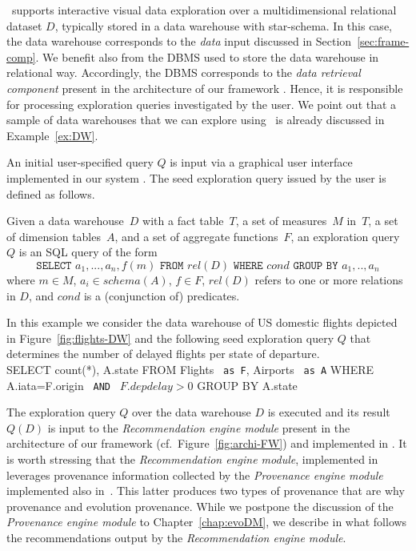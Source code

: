 

\prototype\ supports interactive visual data exploration over a multidimensional relational dataset $D$, typically stored in a data warehouse with star-schema. 
In this case, the data warehouse corresponds to the \emph{data} input discussed in Section~\ref{sec:frame-comp}.
We benefit also from the DBMS used to store the data warehouse in relational way. Accordingly, the DBMS corresponds to the \emph{data retrieval component} present in the architecture of our framework \framework{}. Hence, it is responsible for processing exploration queries investigated by the user.  We point out that a sample of data warehouses that we can explore using~\prototype{} is already discussed in Example~\ref{ex:DW}.



An initial user-specified query $Q$ is input via a graphical user interface implemented in our system \prototype{}.
The seed exploration query issued by the user is defined as follows.

\begin{definition} Given a data warehouse~$D$ with a fact table~$T$, a set of measures~$M$ in~$T$, a set of dimension tables~$A$, and a set of aggregate functions~$F$, an exploration query~$Q$ is an SQL query of the form\\
\vspace{-1em}
\[\texttt{SELECT }a_1,..., a_n, f(m) \texttt{ FROM } rel(D)\texttt{ WHERE }cond \texttt{ GROUP BY }a_1, .., a_n \]
\noindent where $m \in M$, $a_i \in schema(A)$, $f \in F$, $rel(D)$ refers to one or more relations in $D$, and $cond$ is a (conjunction of) predicates.
\label{def:exp-query}
\end{definition}

\begin{example}
\label{ex:query}
In this example we consider the data warehouse of US domestic flights depicted in Figure~\ref{fig:flights-DW} and the following seed exploration query $Q$ that determines the number of delayed flights per state of departure.\\
 \textsf{SELECT} count(*), A.state \textsf{ FROM } Flights \texttt{ as F}, Airports \texttt{ as A} \textsf{ WHERE }A.iata=F.origin \texttt{ AND } $F.depdelay>0$\textsf{ GROUP BY }A.state
\end{example}



The exploration query $Q$ over the data warehouse $D$ is executed and its result $Q(D)$ is input to the \emph{Recommendation engine module} present in the architecture of our framework \framework{} (cf.~Figure~\ref{fig:archi-FW}) and implemented in \prototype{}.
It is worth stressing that the \emph{Recommendation engine module}, implemented in \prototype{} leverages provenance information collected by the \emph{Provenance engine module} implemented also in~\prototype{}. 
This latter produces two types of provenance that are why provenance and evolution provenance.
While we postpone the discussion of the \emph{Provenance engine module} to Chapter~\ref{chap:evoDM}, we describe in what follows the recommendations output by the \emph{Recommendation engine module}.

